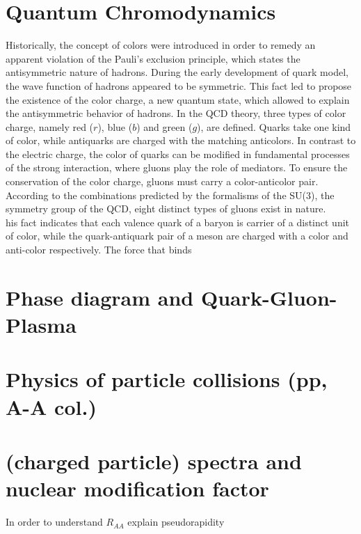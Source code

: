 \documentclass[12pt,a4paper]{report}
\begin{document}
\section{Quantum Chromodynamics}
Historically, the concept of colors were introduced in order to remedy an apparent violation of the Pauli's exclusion principle, which states the antisymmetric nature of hadrons. During the early development of quark model, the wave function of hadrons appeared to be symmetric. This fact led to propose the existence of the color charge, a new quantum state, which allowed to explain the antisymmetric behavior of hadrons. In the QCD theory, three types of color charge, namely red ($r$), blue ($b$) and green ($g$), are defined. Quarks take one kind of color, while antiquarks are charged with the matching anticolors. In contrast to the electric charge, the color of quarks can be modified in fundamental processes of the strong interaction, where gluons play the role of mediators. To ensure the conservation of the color charge, gluons must carry a color-anticolor pair. According to the combinations predicted by the formalisms of the SU(3), the symmetry group of the QCD, eight distinct types of gluons exist in nature. \\


his fact indicates that each valence quark of a baryon is carrier of a distinct unit of color, while the quark-antiquark pair of a meson are charged with a color and anti-color respectively. The force that binds 

\section{Phase diagram and Quark-Gluon-Plasma}
\section{Physics of particle collisions (pp, A-A col.)}
\section{(charged particle) \pt spectra and nuclear modification factor}
In order to understand $R_{AA}$ 
explain pseudorapidity
\end{document}
